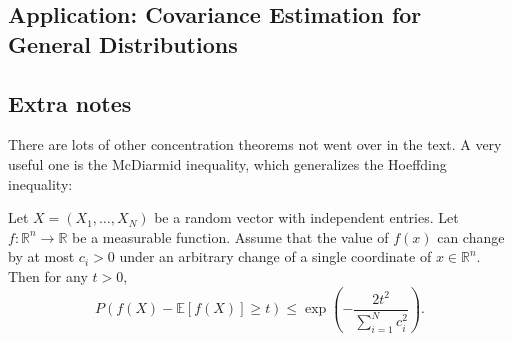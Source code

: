 \subsection{Application: Covariance Estimation for General Distributions}



\subsection{Extra notes}
There are lots of other concentration theorems not went over in the text. A very useful one is the McDiarmid 
inequality, which generalizes the Hoeffding inequality:

\begin{theorem}
\label{thm:5.7.1}
Let $X = (X_1, \dots, X_N)$ be a random vector with independent entries. Let $f: \mathbb{R}^n \to \mathbb{R}$ 
be a measurable function. Assume that the value of $f(x)$ can change by at most $c_i > 0$ under an arbitrary 
change of a single coordinate of $x \in \mathbb{R}^n$. Then for any $t > 0$, 
\[ P(f(X) - \mathbb{E}[f(X)] \geq t) \leq \exp{\left( -\frac{2t^2}{\sum_{i = 1}^{N}c_i^2} \right)}. \]
\end{theorem}
